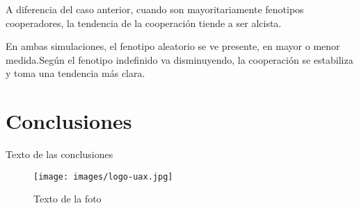 \documentclass[a4paper,12pt]{report}
\begin{document}
A diferencia del caso anterior, cuando son mayoritariamente fenotipos cooperadores, la tendencia de la cooperación tiende a ser alcista.

 En ambas simulaciones, el fenotipo aleatorio se ve presente, en mayor o menor medida.Según el fenotipo indefinido va disminuyendo, la cooperación se estabiliza y toma una tendencia más clara.


\chapter{Conclusiones}

Texto de las conclusiones


\begin{figure}[h!]
    \centering
    \texttt{[image: images/logo-uax.jpg]} %
    \caption{Texto de la foto}
    \label{fig:etiqueta}
\end{figure}


\cite{paper_fenotipos}

\renewcommand{\bibname}{Bibliografía}
\printbibliography%
\end{document}
